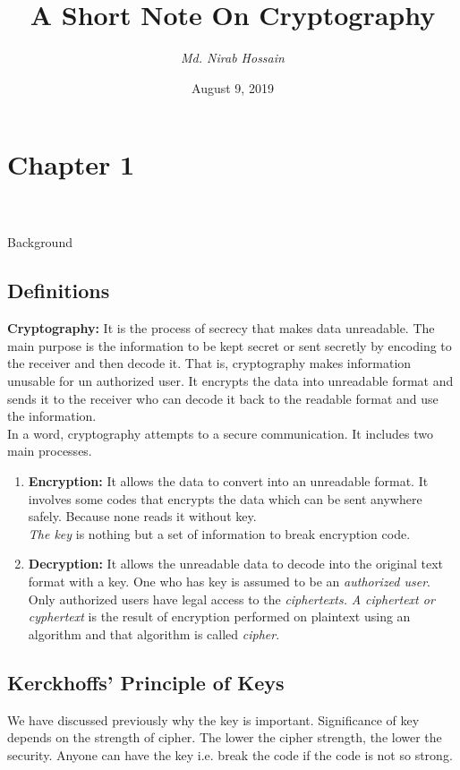 \documentclass[a4paper,12pt]{article}
\newcommand{\B}{\color{blue}}
\newcommand{\Gr}{\color{gray}}
\newcommand{\Or}{\color{orange}}
\newcommand{\V}{\vspace{2cm}}
\newcommand{\A}{ \author{\it\Gr Md. Nirab Hossain}}
\newcommand{\C}{\title}
\newcommand{\D}{\date{August 9, 2019} \maketitle}
\begin{document}
	\C{\bf\B\Huge A Short Note On Cryptography} \A \D
	\pagebreak
	\section{\Large Chapter 1\\\\}
	\begin{center}
		{\Huge\sc\Or Background}
	\end{center}
\vspace{8cm}
	\subsection{Definitions}
	{\bf Cryptography:}
	It is the process of secrecy that makes data unreadable. The main purpose is the information to be kept secret or sent secretly by encoding to the receiver and then decode it. That is, cryptography makes information unusable for un authorized user. It encrypts the data into unreadable format and sends it to the receiver who can decode it back to the readable format and use the information.\\
	In a word, cryptography attempts to a secure communication. It includes two main processes. 
	\begin{enumerate}
		\item {\bf Encryption:} It allows the data to convert into an unreadable format. It involves some codes that encrypts the data which can be sent anywhere safely. Because none reads it without key.\\
		{\it The key} is nothing but a set of information to break encryption code.
		
		\item {\bf Decryption:} It allows the unreadable data to decode into the original text format with a key. One who has key is assumed to be an {\it authorized user}. Only authorized users have legal access to the {\it ciphertexts.} {\it A ciphertext or cyphertext} is the result of encryption performed on plaintext using an algorithm and that algorithm is called {\it cipher}.
	\end{enumerate}

\V
	\subsection{Kerckhoffs' Principle of Keys}
	We have discussed previously why the key is important. Significance of key depends on the strength of cipher. The lower the cipher strength, the lower the security. Anyone can have the key i.e. break the code if the code is not so strong.
	
\end{document}
